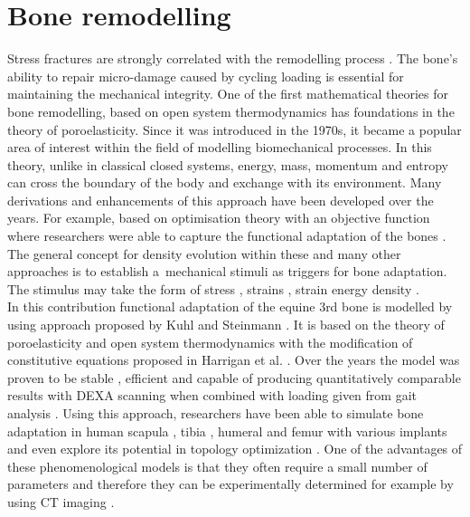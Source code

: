 \documentclass[11pt]{ACMEarticle}
\numberwithin{equation}{section}
\begin{document}
\section{Bone remodelling} 
\label{sec:bone_remodel}
Stress fractures are strongly correlated with the remodelling process \citep{hughes2017role}. The bone's ability to repair micro-damage caused by cycling loading is essential for maintaining the mechanical integrity. One of the first mathematical theories for bone remodelling, based on open system thermodynamics \citep{cowin1976bone} has foundations in the theory of poroelasticity. Since it was introduced in the 1970s, it became a popular area of interest within the field of modelling biomechanical processes. In this theory, unlike in classical closed systems, energy, mass, momentum and entropy can cross the boundary of the body and exchange with its environment. Many derivations and enhancements of this approach have been developed over the years. 
For example, based on optimisation theory with an objective function where researchers were able to capture the functional adaptation of the bones \citep{harrigan1996bone, jacobs1995numerical, weinans1992behavior}.
The general concept for density evolution within these and many other approaches is to establish a~mechanical stimuli as triggers for bone adaptation. The stimulus may take the form of stress \citep{beaupre1990approach, carter1996mechanical, doblare2002anisotropic}, strains \citep{cowin1976bone}, strain energy density \citep{weinans1992behavior, kuhl2003theory,kaczmarczyk2011efficient, Connor2017bone}. \\ 
In this contribution functional adaptation of the equine 3rd bone is modelled by using approach proposed by Kuhl and Steinmann \citep{kuhl2003theory}. It is based on the theory of poroelasticity and open system thermodynamics with the modification of constitutive equations proposed in Harrigan et al. \citep{harrigan1996bone}. Over the years the model was proven to be stable \citep{kuhl2003computational}, efficient \citep{kaczmarczyk2011efficient} and capable of producing quantitatively comparable results with DEXA scanning when combined with loading given from gait analysis \citep{pang2012computational}. Using this approach, researchers have been able to simulate bone adaptation in human scapula \citep{liedtke2017computational}, tibia \citep{pang2012computational}, humeral \citep{taylor2009phenomenon} and femur with various implants \citep{ambrosi2011perspectives, Connor2017bone} and even explore its potential in topology optimization \citep{waffenschmidt2012application}. One of the advantages of these phenomenological models is that they often require a small number of parameters and therefore they can be experimentally determined for example by using CT imaging \citep{zadpoor2013open}.\\ 
\end{document}
